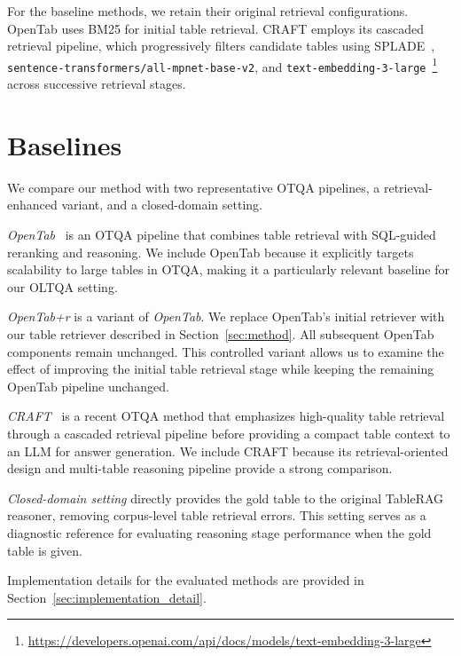 For the baseline methods, we retain their original retrieval configurations.
OpenTab uses BM25 for initial table retrieval.
CRAFT employs its cascaded retrieval pipeline, which progressively filters candidate tables using SPLADE~\cite{splade}, \texttt{sentence-transformers/all-mpnet-base-v2}, and \texttt{text-embedding-3-large}~\footnote{\url{https://developers.openai.com/api/docs/models/text-embedding-3-large}} across successive retrieval stages.

\section{Baselines}

We compare our method with two representative OTQA pipelines, a retrieval-enhanced variant, and a closed-domain setting.

\textit{OpenTab}~\cite{opentab} is an OTQA pipeline that combines table retrieval with SQL-guided reranking and reasoning.
We include OpenTab because it explicitly targets scalability to large tables in OTQA, making it a particularly relevant baseline for our OLTQA setting.

\textit{OpenTab+r} is a variant of \textit{OpenTab}.
We replace OpenTab's initial retriever with our table retriever described in Section~\ref{sec:method}.
All subsequent OpenTab components remain unchanged.
This controlled variant allows us to examine the effect of improving the initial table retrieval stage while keeping the remaining OpenTab pipeline unchanged.

\textit{CRAFT}~\cite{craft} is a recent OTQA method that emphasizes high-quality table retrieval through a cascaded retrieval pipeline before providing a compact table context to an LLM for answer generation.
We include CRAFT because its retrieval-oriented design and multi-table reasoning pipeline provide a strong comparison.

\textit{Closed-domain setting} directly provides the gold table to the original TableRAG~\cite{tablerag} reasoner, removing corpus-level table retrieval errors.
This setting serves as a diagnostic reference for evaluating reasoning stage performance when the gold table is given.

Implementation details for the evaluated methods are provided in Section~\ref{sec:implementation_detail}.

